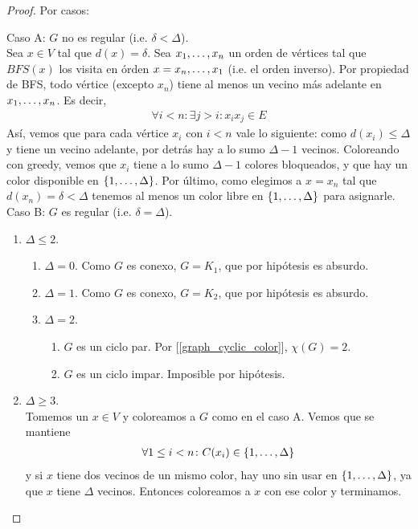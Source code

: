 \begin{proof}
Por casos:

Caso A: $G$ no es regular (i.e. $\delta < \Delta$).\\
Sea $x \in V$ tal que $d(x) = \delta$. Sea $x_1, \mathellipsis, x_n$ un orden de vértices tal que $BFS(x)$ los visita en órden $x = x_n, \mathellipsis, x_1$ (i.e. el orden inverso). Por propiedad de BFS, todo vértice (excepto $x_n$) tiene al menos un vecino más adelante en $x_1, \mathellipsis, x_n$. Es decir,
    \begin{align}
        \forall i < n \colon \exists j > i \colon x_ix_j \in E    
    \end{align}
Así, vemos que para cada vértice $x_i$ con $i < n$ vale lo siguiente: como $d(x_i) \le \Delta$ y tiene un vecino adelante, por detrás hay a lo sumo $\Delta - 1$ vecinos. Coloreando con greedy, vemos que $x_i$ tiene a lo sumo $\Delta - 1$ colores bloqueados, y que hay un color disponible en $\{1, \mathellipsis, \Delta\}$. Por último, como elegimos a $x = x_n$ tal que $d(x_n) = \delta < \Delta$ tenemos al menos un color libre en $\{1, \mathellipsis, \Delta\}$ para asignarle.\\

Caso B: $G$ es regular (i.e. $\delta = \Delta$).
\begin{enumerate}
    \item $\Delta \le 2$.
    \begin{enumerate}
        \item $\Delta = 0$. Como $G$ es conexo, $G = K_1$, que por hipótesis es absurdo.
        \item $\Delta = 1$. Como $G$ es conexo, $G = K_2$, que por hipótesis es absurdo.
        \item $\Delta = 2$.
        \begin{enumerate}
            \item $G$ es un ciclo par. Por [\ref{graph_cyclic_color}], $\chi(G) = 2$.
            \item $G$ es un ciclo impar. Imposible por hipótesis.
        \end{enumerate}
    \end{enumerate}

    \item $\Delta \ge 3$.\\
    Tomemos un $x \in V$ y coloreamos a $G$ como en el caso A. Vemos que se mantiene
    \begin{align}
        \forall 1 \le i < n \colon C(x_i) \in \{1, \mathellipsis, \Delta\}
    \end{align}
    y si $x$ tiene dos vecinos de un mismo color, hay uno sin usar en $\{1, \mathellipsis, \Delta\}$, ya que $x$ tiene $\Delta$ vecinos. Entonces coloreamos a $x$ con ese color y terminamos.


\end{enumerate}
\end{proof}
